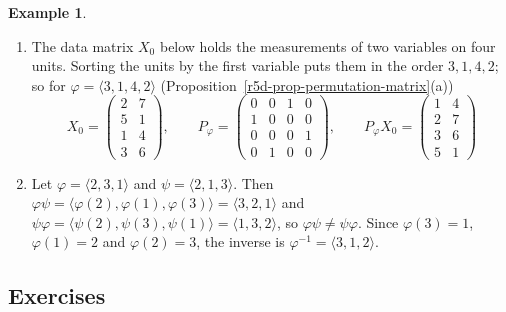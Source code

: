 \documentclass[12pt]{article}
\theoremstyle{definition}
\newtheorem{example}[theorem]{Example}
\begin{document}
\begin{example}\label{r5d-exm-permutations}
\begin{enumerate}
\item The data matrix \(X_0\) below holds the measurements of two variables on four units. Sorting the units by the
first variable puts them in the order \(3,1,4,2\); so for \(\varphi=\langle3,1,4,2\rangle\)
(Proposition~\ref{r5d-prop-permutation-matrix}(a))
\[
X_0=\begin{pmatrix}2&7\\5&1\\1&4\\3&6\end{pmatrix},\qquad
P_\varphi=\begin{pmatrix}0&0&1&0\\1&0&0&0\\0&0&0&1\\0&1&0&0\end{pmatrix},\qquad
P_\varphi X_0=\begin{pmatrix}1&4\\2&7\\3&6\\5&1\end{pmatrix}
\]
\item Let \(\varphi=\langle2,3,1\rangle\) and \(\psi=\langle2,1,3\rangle\). Then
\(\varphi\psi=\langle\varphi(2),\varphi(1),\varphi(3)\rangle=\langle3,2,1\rangle\) and
\(\psi\varphi=\langle\psi(2),\psi(3),\psi(1)\rangle=\langle1,3,2\rangle\), so \(\varphi\psi\ne\psi\varphi\). Since
\(\varphi(3)=1\), \(\varphi(1)=2\) and \(\varphi(2)=3\), the inverse is \(\varphi^{-1}=\langle3,1,2\rangle\).
\end{enumerate}
\end{example}

\subsection*{Exercises}
\end{document}
